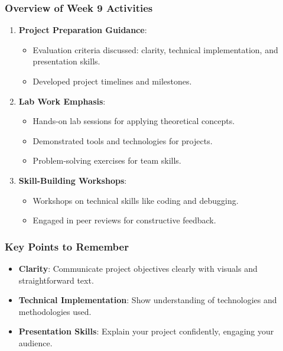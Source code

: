 \documentclass[aspectratio=169]{beamer}
\begin{document}
\begin{frame}[fragile]
    \frametitle{Overview of Week 9 Activities}
    \begin{enumerate}
        \item \textbf{Project Preparation Guidance}:
            \begin{itemize}
                \item Evaluation criteria discussed: clarity, technical implementation, and presentation skills.
                \item Developed project timelines and milestones.
            \end{itemize}
        
        \item \textbf{Lab Work Emphasis}:
            \begin{itemize}
                \item Hands-on lab sessions for applying theoretical concepts.
                \item Demonstrated tools and technologies for projects.
                \item Problem-solving exercises for team skills.
            \end{itemize}
        
        \item \textbf{Skill-Building Workshops}:
            \begin{itemize}
                \item Workshops on technical skills like coding and debugging.
                \item Engaged in peer reviews for constructive feedback.
            \end{itemize}
    \end{enumerate}
\end{frame}

\begin{frame}[fragile]
    \frametitle{Key Points to Remember}
    \begin{itemize}
        \item \textbf{Clarity}: Communicate project objectives clearly with visuals and straightforward text.
        \item \textbf{Technical Implementation}: Show understanding of technologies and methodologies used.
        \item \textbf{Presentation Skills}: Explain your project confidently, engaging your audience.
    \end{itemize}
\end{frame}
\end{document}
